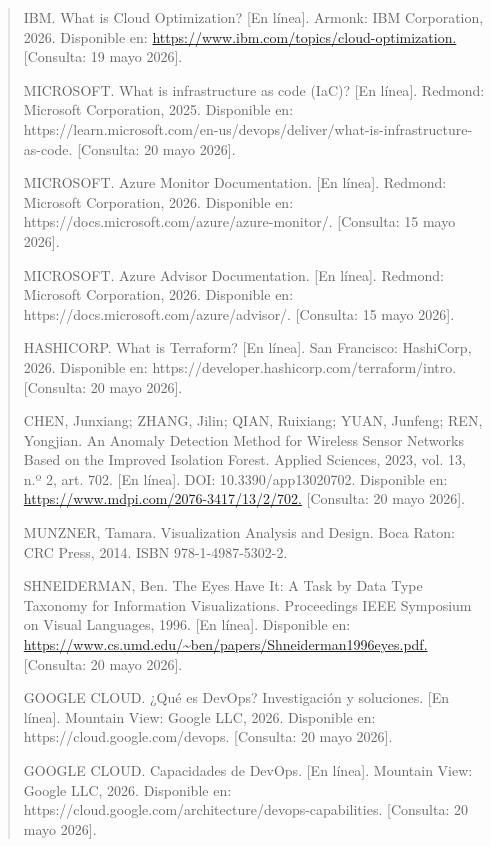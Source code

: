 \documentclass[
]{article}
\begin{document}
\begin{quote}
IBM. What is Cloud Optimization? {[}En línea{]}. Armonk: IBM
Corporation, 2026. Disponible en:
\href{http://www.ibm.com/topics/cloud-optimization}{https://www.ibm.com/topics/cloud-optimization.}
{[}Consulta: 19 mayo 2026{]}.

MICROSOFT. What is infrastructure as code (IaC)? {[}En línea{]}.
Redmond: Microsoft Corporation, 2025. Disponible en:
https://learn.microsoft.com/en-us/devops/deliver/what-is-infrastructure-as-code.
{[}Consulta: 20 mayo 2026{]}.

MICROSOFT. Azure Monitor Documentation. {[}En línea{]}. Redmond:
Microsoft Corporation, 2026. Disponible en:
https://docs.microsoft.com/azure/azure-monitor/. {[}Consulta: 15 mayo
2026{]}.

MICROSOFT. Azure Advisor Documentation. {[}En línea{]}. Redmond:
Microsoft Corporation, 2026. Disponible en:
https://docs.microsoft.com/azure/advisor/. {[}Consulta: 15 mayo 2026{]}.

HASHICORP. What is Terraform? {[}En línea{]}. San Francisco: HashiCorp,
2026. Disponible en: https://developer.hashicorp.com/terraform/intro.
{[}Consulta: 20 mayo 2026{]}.

CHEN, Junxiang; ZHANG, Jilin; QIAN, Ruixiang; YUAN, Junfeng; REN,
Yongjian. An Anomaly Detection Method for Wireless Sensor Networks Based
on the Improved Isolation Forest. Applied Sciences, 2023, vol. 13, n.º
2, art. 702. {[}En línea{]}. DOI: 10.3390/app13020702. Disponible en:
\href{http://www.mdpi.com/2076-3417/13/2/702}{https://www.mdpi.com/2076-3417/13/2/702.}
{[}Consulta: 20 mayo 2026{]}.

MUNZNER, Tamara. Visualization Analysis and Design. Boca Raton: CRC
Press, 2014. ISBN 978-1-4987-5302-2.

SHNEIDERMAN, Ben. The Eyes Have It: A Task by Data Type Taxonomy for
Information Visualizations. Proceedings IEEE Symposium on Visual
Languages, 1996. {[}En línea{]}. Disponible en:
\href{http://www.cs.umd.edu/~ben/papers/Shneiderman1996eyes.pdf}{https://www.cs.umd.edu/\textasciitilde ben/papers/Shneiderman1996eyes.pdf.}
{[}Consulta: 20 mayo 2026{]}.

GOOGLE CLOUD. ¿Qué es DevOps? Investigación y soluciones. {[}En
línea{]}. Mountain View: Google LLC, 2026. Disponible en:
https://cloud.google.com/devops. {[}Consulta: 20 mayo 2026{]}.

GOOGLE CLOUD. Capacidades de DevOps. {[}En línea{]}. Mountain View:
Google LLC, 2026. Disponible en:
https://cloud.google.com/architecture/devops-capabilities. {[}Consulta:
20 mayo 2026{]}.


\end{quote}
\end{document}
